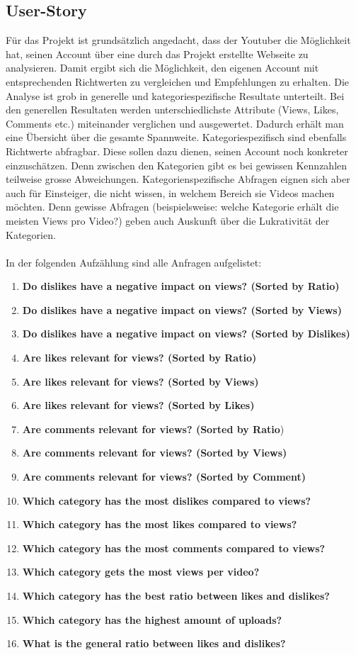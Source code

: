 \documentclass[12pt,titlepage]{article}
\begin{document}
\subsection{User-Story}
Für das Projekt ist grundsätzlich angedacht, dass der Youtuber die Möglichkeit hat, seinen Account über eine durch das Projekt erstellte Webseite zu analysieren. Damit ergibt sich die Möglichkeit, den eigenen Account mit entsprechenden Richtwerten zu vergleichen und Empfehlungen zu erhalten. Die Analyse ist grob in generelle und kategoriespezifische Resultate unterteilt. Bei den generellen Resultaten werden unterschiedlichste Attribute (Views, Likes, Comments etc.) miteinander verglichen und ausgewertet. Dadurch erhält man eine Übersicht über die gesamte Spannweite. Kategoriespezifisch sind ebenfalls Richtwerte abfragbar. Diese sollen dazu dienen, seinen Account noch konkreter einzuschätzen. Denn zwischen den Kategorien gibt es bei gewissen Kennzahlen teilweise grosse Abweichungen. Kategorienspezifische Abfragen eignen sich aber auch für Einsteiger, die nicht wissen, in welchem Bereich sie Videos machen möchten. Denn gewisse Abfragen (beispielsweise: \glqq welche Kategorie erhält die meisten Views pro Video?\grqq) geben auch Auskunft über die Lukrativität der Kategorien. \\
\\
In der folgenden Aufzählung sind alle Anfragen aufgelistet:
\begin{enumerate}
\item \textbf{Do dislikes have a negative impact on views? (Sorted by Ratio)}
\item \textbf{Do dislikes have a negative impact on views? (Sorted by Views)}
\item \textbf{Do dislikes have a negative impact on views? (Sorted by Dislikes)}
\item \textbf{Are likes relevant for views? (Sorted by Ratio)}
\item \textbf{Are likes relevant for views? (Sorted by Views)}
\item \textbf{Are likes relevant for views? (Sorted by Likes)}
\item \textbf{Are comments relevant for views? (Sorted by Ratio})
\item \textbf{Are comments relevant for views? (Sorted by Views)}
\item \textbf{Are comments relevant for views? (Sorted by Comment)}
\item \textbf{Which category has the most dislikes compared to views?}
\item \textbf{Which category has the most likes compared to views?}
\item \textbf{Which category has the most comments compared to views?}
\item \textbf{Which category gets the most views per video?}
\item \textbf{Which category has the best ratio between likes and dislikes?}
\item \textbf{Which category has the highest amount of uploads?}
\item \textbf{What is the general ratio between likes and dislikes?}
\end{enumerate}
\end{document}
